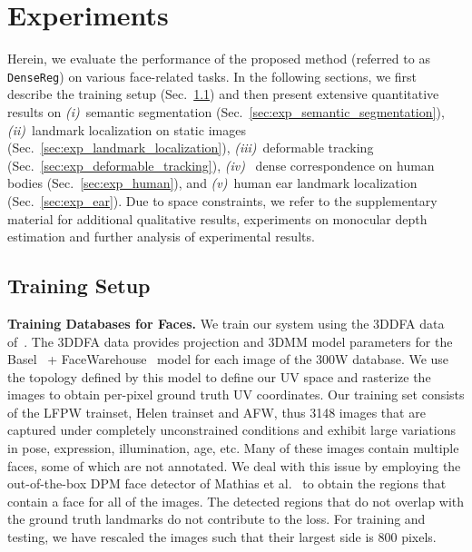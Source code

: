 \section{Experiments}
\label{sec:experiments}
Herein, we evaluate the performance of the proposed method (referred to as \texttt{DenseReg}) on various face-related tasks. 
In the following sections, we first describe the training setup (Sec.~\ref{sec:training_setup}) and then present extensive quantitative results on \emph{(i)}~semantic segmentation (Sec.~\ref{sec:exp_semantic_segmentation}), \emph{(ii)}~landmark localization on static images (Sec.~\ref{sec:exp_landmark_localization}), \emph{(iii)}~deformable tracking (Sec.~\ref{sec:exp_deformable_tracking}), \emph{(iv)}~ dense correspondence on human bodies (Sec.~\ref{sec:exp_human}), and \emph{(v)}~human ear landmark localization (Sec.~\ref{sec:exp_ear}).
Due to space constraints, we refer to the supplementary material for additional qualitative results, experiments on monocular depth estimation and further analysis of experimental results.


\subsection{Training Setup}
\label{sec:training_setup}

\textbf{Training Databases for Faces.} We train our system using the 3DDFA data of~\cite{zhu2016face}. The 3DDFA data provides projection and 3DMM model parameters for the Basel~\cite{paysan20093d} + FaceWarehouse~\cite{cao2014facewarehouse} model for each image of the 300W database. We use the topology defined by this model to define our UV space and rasterize the images to obtain per-pixel ground truth UV coordinates.  Our training set consists of the LFPW trainset, Helen trainset and AFW, thus 3148 images
that are captured under completely unconstrained conditions
and exhibit large variations in pose, expression, illumination,
age, etc.
 Many of these images contain multiple faces, some of which are not annotated. We deal with this issue by employing the out-of-the-box DPM face detector of Mathias et al.~\cite{mathias2014face} to obtain the regions that contain a face for all of the images. The detected regions that do not overlap with the ground truth landmarks do not contribute to the loss. For training and testing, we have rescaled the images such that their largest side is 800 pixels.
 
